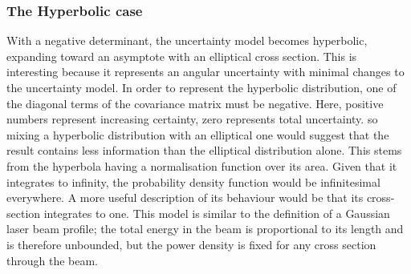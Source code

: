 \documentclass[a4paper, 11pt, titlepage]{article}
\begin{document}
    \subsubsection{The Hyperbolic case}
      With a negative determinant, the uncertainty model becomes hyperbolic, expanding toward an asymptote with an elliptical cross section.  This is interesting because it represents an angular uncertainty with minimal changes to the uncertainty model.
      In order to represent the hyperbolic distribution, one of the diagonal terms of the covariance matrix must be negative.  Here, positive numbers represent increasing certainty, zero represents total uncertainty.  so mixing a hyperbolic distribution with an elliptical one would suggest that the result contains less information than the elliptical distribution alone.
      This stems from the hyperbola having a normalisation function over its area.  Given that it integrates to infinity, the probability density function would be infinitesimal everywhere.  A more useful description of its behaviour would be that its cross-section integrates to one.
      This model is similar to the definition of a Gaussian laser beam profile; the total energy in the beam is proportional to its length and is therefore unbounded, but the power density is fixed for any cross section through the beam.
\end{document}
